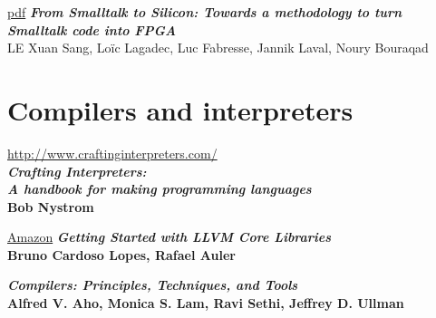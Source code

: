 \begin{thebibliography}{99}
\href{http://esug.org/data/ESUG2014/IWST/Papers/iwst2014_From%20Smalltalk%20to%20Silicon_Towards%20a%20methodology%20to%20turn%20Smalltalk%20code%20into%20FPGA.pdf}{pdf}
\emph{\textbf{From Smalltalk to Silicon: Towards a methodology to turn Smalltalk
code into FPGA}}\\
LE Xuan Sang, Loïc Lagadec, Luc Fabresse, Jannik Laval, Noury Bouraqad

\section*{Compilers and interpreters}

\url{http://www.craftinginterpreters.com/}\\
\emph{\textbf{Crafting Interpreters:\\A handbook for making programming
languages}}\\
\textbf{Bob Nystrom}

\href{https://www.amazon.com/Getting-Started-LLVM-Core-Libraries/dp/1782166920}{Amazon}
\emph{\textbf{Getting Started with LLVM Core Libraries}}\\
\textbf{Bruno Cardoso Lopes, Rafael Auler}

\emph{\textbf{Compilers: Principles, Techniques, and Tools}}\\
\textbf{Alfred V. Aho, Monica S. Lam, Ravi Sethi, Jeffrey D. Ullman }

\end{thebibliography}
